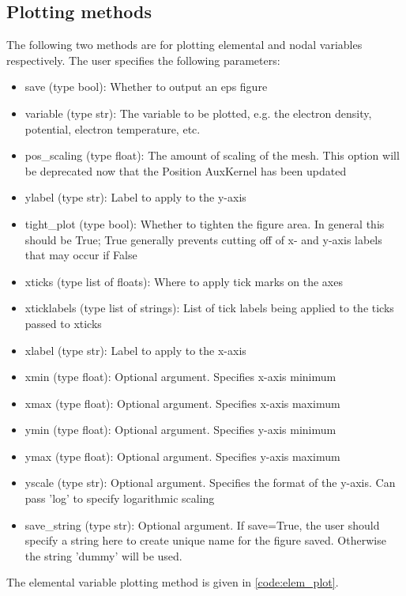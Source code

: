 \subsection{Plotting methods}
\label{sec:plotting_methods}

The following two methods are for plotting elemental and nodal variables respectively. The user specifies the following parameters:

\begin{itemize}
\label{list:plot_args}
  \item save (type bool): Whether to output an eps figure
  \item variable (type str): The variable to be plotted, e.g. the electron density, potential, electron temperature, etc.
  \item pos\_scaling (type float): The amount of scaling of the mesh. This option will be deprecated now that the Position AuxKernel has been updated
  \item ylabel (type str): Label to apply to the y-axis
  \item tight\_plot (type bool): Whether to tighten the figure area. In general this should be True; True generally prevents cutting off of x- and y-axis labels that may occur if False
  \item xticks (type list of floats): Where to apply tick marks on the axes
  \item xticklabels (type list of strings): List of tick labels being applied to the ticks passed to xticks
  \item xlabel (type str): Label to apply to the x-axis
  \item xmin (type float): Optional argument. Specifies x-axis minimum
  \item xmax (type float): Optional argument. Specifies x-axis maximum
  \item ymin (type float): Optional argument. Specifies y-axis minimum
  \item ymax (type float): Optional argument. Specifies y-axis maximum
  \item yscale (type str): Optional argument. Specifies the format of the y-axis. Can pass 'log' to specify logarithmic scaling
  \item save\_string (type str): Optional argument. If save=True, the user should specify a string here to create unique name for the figure saved. Otherwise the string 'dummy' will be used.
\end{itemize}

The elemental variable plotting method is given in \cref{code:elem_plot}.

